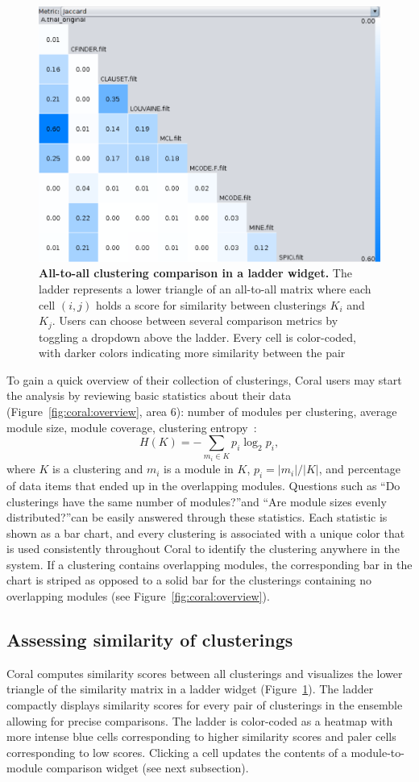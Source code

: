 \documentclass[12pt]{cmuthesis}
\newcommand\Coral{Coral\xspace}
\begin{document}
\begin{figure}[h]
    \centering
    \includegraphics[width=0.60\linewidth]{figures/coral_ladder}
    \caption{\textbf{All-to-all clustering comparison in a ladder widget.} The ladder represents  a lower triangle of an all-to-all matrix where each cell $(i, j)$ holds a score for similarity between clusterings $K_{i}$ and $K_{j}$. Users can choose between several comparison metrics by toggling a dropdown above the ladder. Every cell is color-coded, with darker colors indicating more similarity between the pair} 
    \label{fig:coral:ladder}
  \end{figure}


  To gain a quick overview of their collection of clusterings, \Coral users may start the analysis by reviewing basic statistics about their data (Figure~\ref{fig:coral:overview}, area 6): number of modules per clustering, average module size, module coverage, clustering entropy~\cite{Meila2003}:
  \[
  H(K) = - \sum_{m_i \in K} p_i \log_2 p_i,
  \]
  where $K$ is a clustering and $m_i$ is a module in $K$, $p_i = |m_i| / |K|$, and percentage of data items that ended up in the overlapping modules. Questions such as ``Do clusterings have the same number of modules?''\@ and ``Are module sizes evenly distributed?''\@ can be easily answered through these statistics. Each statistic is shown as a bar chart, and every clustering is associated with a unique color that is used consistently throughout \Coral to identify the clustering anywhere in the system. If a clustering contains overlapping modules, the corresponding bar in the chart is striped as opposed to a solid bar for the clusterings containing no overlapping modules (see Figure~\ref{fig:coral:overview}).

  \subsection{Assessing similarity of clusterings}
  \Coral computes similarity scores between all clusterings and visualizes the lower triangle of the similarity matrix in a ladder widget (Figure~\ref{fig:coral:ladder}). The ladder compactly displays similarity scores for every pair of clusterings in the ensemble allowing for precise comparisons. The ladder is color-coded as a heatmap with more intense blue cells corresponding to higher similarity scores and paler cells corresponding to low scores. Clicking a cell updates the contents of a module-to-module comparison widget (see next subsection).
\end{document}
